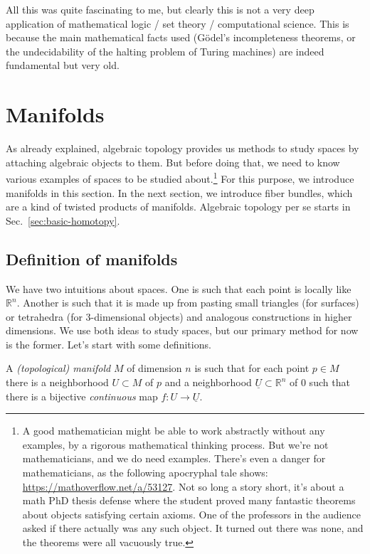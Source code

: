 \documentclass[12pt]{article}
\numberwithin{equation}{section}
\numberwithin{figure}{section}
\theoremstyle{remark}
\def\bR{\mathbb{R}}
\begin{document}
All this was quite fascinating to me, 
but clearly this is not a very deep application of mathematical logic / set theory / computational science.
This is because the main mathematical facts used (G\"odel's incompleteness theorems, or the undecidability of the halting problem of Turing machines) are indeed fundamental but very old.


\section{Manifolds}

As already explained, algebraic topology provides us methods to study spaces by attaching algebraic objects to them.
But before doing that, we need to know various examples of spaces to be studied about.\footnote{%
A good mathematician might be able to work abstractly without any examples,
by a rigorous mathematical thinking process.
But we're not mathematicians, and we do need examples.
There's even a danger for mathematicians, as the following apocryphal tale shows: \url{https://mathoverflow.net/a/53127}.
Not so long a story short, it's about a math PhD thesis defense where the student proved many fantastic theorems about objects satisfying certain axioms.
One of the professors in the audience asked if there actually was any such object.
It turned out there was none, and the theorems were all vacuously true.
}
For this purpose, we introduce manifolds in this section.
In the next section, we introduce fiber bundles, which are a kind of twisted products of manifolds.
Algebraic topology per se starts in Sec.~\ref{sec:basic-homotopy}.


\subsection{Definition of manifolds}

We have two intuitions about spaces.
One is such that each point is locally like $\bR^n$.
Another is such that it is made up from pasting small triangles (for surfaces) or tetrahedra (for 3-dimensional objects) and analogous constructions in higher dimensions.
We use both ideas to study spaces,
but our primary method for now is the former.
Let's start with some definitions.

\begin{definition}
A \emph{(topological) manifold} $M$ of dimension $n$ is such that for each point $p\in M$ there is a neighborhood $U\subset M$ of $p$ and a neighborhood $\underline{U}\subset \bR^n$ of $0$ such that 
there is a bijective \emph{continuous} map $f:U\to \underline{U}$.
\end{definition}
\end{document}

